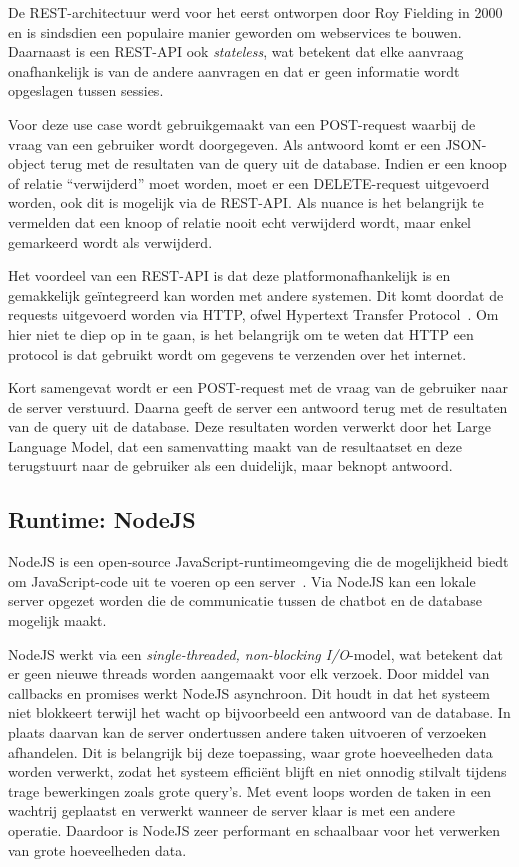 De REST-architectuur werd voor het eerst ontworpen door Roy Fielding in 2000 en is sindsdien een populaire manier geworden om webservices te bouwen.
Daarnaast is een REST-API ook \emph{stateless}, wat betekent dat elke aanvraag onafhankelijk is van de andere aanvragen en dat er geen informatie wordt opgeslagen tussen sessies.

Voor deze use case wordt gebruikgemaakt van een POST-request waarbij de vraag van een gebruiker wordt doorgegeven.
Als antwoord komt er een JSON-object terug met de resultaten van de query uit de database.
Indien er een knoop of relatie ``verwijderd'' moet worden, moet er een DELETE-request uitgevoerd worden, ook dit is mogelijk via de REST-API.
Als nuance is het belangrijk te vermelden dat een knoop of relatie nooit echt verwijderd wordt, maar enkel gemarkeerd wordt als verwijderd.

Het voordeel van een REST-API is dat deze platformonafhankelijk is en gemakkelijk geïntegreerd kan worden met andere systemen.
Dit komt doordat de requests uitgevoerd worden via HTTP, ofwel Hypertext Transfer Protocol~\autocite{HTTP25}.
Om hier niet te diep op in te gaan, is het belangrijk om te weten dat HTTP een protocol is dat gebruikt wordt om gegevens te verzenden over het internet.

Kort samengevat wordt er een POST-request met de vraag van de gebruiker naar de server verstuurd. Daarna geeft de server een antwoord terug met de resultaten van de query uit de database.
Deze resultaten worden verwerkt door het Large Language Model, dat een samenvatting maakt van de resultaatset en deze terugstuurt naar de gebruiker als een duidelijk, maar beknopt antwoord.

\subsection{Runtime: NodeJS}
NodeJS is een open-source JavaScript-runtimeomgeving die de mogelijkheid biedt om JavaScript-code uit te voeren op een server~\autocite{NodeJS2022}.
Via NodeJS kan een lokale server opgezet worden die de communicatie tussen de chatbot en de database mogelijk maakt.

NodeJS werkt via een \emph{single-threaded, non-blocking I/O}-model, wat betekent dat er geen nieuwe threads worden aangemaakt voor elk verzoek.
Door middel van callbacks en promises werkt NodeJS asynchroon. 
Dit houdt in dat het systeem niet blokkeert terwijl het wacht op bijvoorbeeld een antwoord van de database. 
In plaats daarvan kan de server ondertussen andere taken uitvoeren of verzoeken afhandelen. 
Dit is belangrijk bij deze toepassing, waar grote hoeveelheden data worden verwerkt, zodat het systeem efficiënt blijft en niet onnodig stilvalt tijdens trage bewerkingen zoals grote query's.
Met event loops worden de taken in een wachtrij geplaatst en verwerkt wanneer de server klaar is met een andere operatie.
Daardoor is NodeJS zeer performant en schaalbaar voor het verwerken van grote hoeveelheden data.

